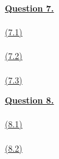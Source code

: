 \documentclass[12pt]{article}
\begin{document}
\hyperlink{toc}{\LARGE \underline{\textbf{Question 7.}}}\\
~\\\hyperlink{toc}{\hypertarget{7.1}{(7.1)}}\\
~\\\hyperlink{toc}{\hypertarget{7.2}{(7.2)}}\\
~\\\hyperlink{toc}{\hypertarget{7.3}{(7.3)}}\\
\newpage

\hyperlink{toc}{\LARGE \underline{\textbf{Question 8.}}}\\
~\\\hyperlink{toc}{\hypertarget{8.1}{(8.1)}}\\
~\\\hyperlink{toc}{\hypertarget{8.2}{(8.2)}}\\
\end{document}
